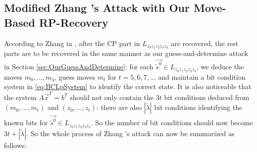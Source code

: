 \subsection{Modified Zhang \etal's Attack with Our Move-Based RP-Recovery}\label{sec:OurRpRecovery}
According to Zhang \etal in \cite{AC:Zhang19}, after the CP part in $L_{z_0z_1z_2z_3z_4}$ are recovered, the rest parts are to be recovered in the same manner as our guess-and-determine attack in Section \ref{sec:OurGuessAndDetermine}: for each $\vec{\tilde{s}^0}\in L_{z_0z_1z_2z_3z_4}$, we deduce the moves $m_0,\ldots, m_4$, guess moves $m_t$ for $t=5,6,7,...$ and maintain a bit condition system in \eqref{eq:BCLpSystem} to identify the correct state.
It is also noticeable that the system $A\vec{x}^T=b^T$ should not only contain the $3t$ bit conditions deduced from $(m_0,\ldots, m_t)$ and $(z_0,\ldots, z_t)$: there are also $|\tilde{\lambda}|$ bit conditions identifying the known bits for $\vec{\tilde{s}^0}\in L_{z_0z_1z_2z_3z_4}$.
So the number of bit conditions should now become $3t+|\tilde{\lambda}|$.
So the whole process of Zhang \etal's attack can now be summarized as follows:
